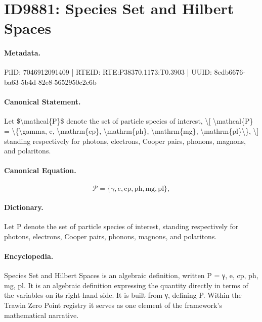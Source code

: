 \section*{ID9881: Species Set and Hilbert Spaces}
\paragraph{Metadata.}
PiID: 7046912091409 | RTEID: RTE:P38370.1173:T0.3903 | UUID: 8edb6676-ba63-5b4d-82e8-5652950c2c6b

\paragraph{Canonical Statement.}
Let \$\textbackslash{}mathcal\{P\}\$ denote the set of particle species of interest, \textbackslash{}[ \textbackslash{}mathcal\{P\} = \textbackslash{}\{\textbackslash{}gamma, e, \textbackslash{}mathrm\{cp\}, \textbackslash{}mathrm\{ph\}, \textbackslash{}mathrm\{mg\}, \textbackslash{}mathrm\{pl\}\textbackslash{}\}, \textbackslash{}] standing respectively for photons, electrons, Cooper pairs, phonons, magnons, and polaritons.

\paragraph{Canonical Equation.}
\[
\mathcal{P} = \{\gamma, e, \mathrm{cp}, \mathrm{ph}, \mathrm{mg}, \mathrm{pl}\},
\]

\paragraph{Dictionary.}
Let P denote the set of particle species of interest, standing respectively for photons, electrons, Cooper pairs, phonons, magnons, and polaritons.

\paragraph{Encyclopedia.}
Species Set and Hilbert Spaces is an algebraic definition, written P = γ, e, cp, ph, mg, pl. It is an algebraic definition expressing the quantity directly in terms of the variables on its right-hand side. It is built from γ, defining P. Within the Trawin Zero Point registry it serves as one element of the framework's mathematical narrative.
